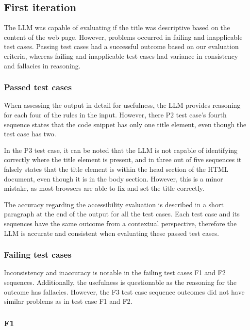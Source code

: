\subsection{First iteration}

The LLM was capable of evaluating if the title was descriptive based on the content of the web page. However, problems occurred in failing and inapplicable test cases. Passing test cases had a successful outcome based on our evaluation criteria, whereas failing and inapplicable test cases had variance in consistency and fallacies in reasoning.

\subsubsection{Passed test cases}

When assessing the output in detail for usefulness, the LLM provides reasoning for each four of the rules in the input. However, there P2 test case's fourth sequence states that the code snippet has only one title element, even though the test case has two. 

In the P3 test case, it can be noted that the LLM is not capable of identifying correctly where the title element is present, and in three out of five sequences it falsely states that the title element is within the head section of the HTML document, even though it is in the body section. However, this is a minor mistake, as most browsers are able to fix and set the title correctly.

The accuracy regarding the accessibility evaluation is described in a short paragraph at the end of the output for all the test cases. Each test case and its sequences have the same outcome from a contextual perspective, therefore the LLM is accurate and consistent when evaluating these passed test cases.

\subsubsection{Failing test cases}

Inconsistency and inaccuracy is notable in the failing test cases F1 and F2 sequences. Additionally, the usefulness is questionable as the reasoning for the outcome has fallacies. However, the F3 test case sequence outcomes did not have similar problems as in test case F1 and F2.

\subsubsection{F1}

